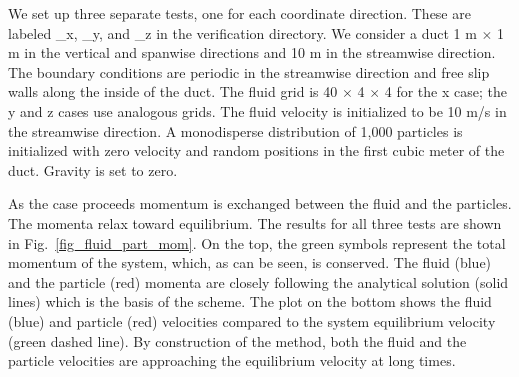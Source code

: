 \documentclass[11pt]{book}
\begin{document}
We set up three separate tests, one for each coordinate direction.  These are labeled \_x, \_y, and \_z in the verification directory.  We consider a duct 1 m $\times$ 1 m in the vertical and spanwise directions and 10 m in the streamwise direction.  The boundary conditions are periodic in the streamwise direction and free slip walls along the inside of the duct. The fluid grid is 40 $\times$ 4 $\times$ 4 for the x case; the y and z cases use analogous grids.  The fluid velocity is initialized to be 10 m/s in the streamwise direction.  A monodisperse distribution of 1,000 particles is initialized with zero velocity and random positions in the first cubic meter of the duct.  Gravity is set to zero.

As the case proceeds momentum is exchanged between the fluid and the particles.  The momenta relax toward equilibrium.  The results for all three tests are shown in Fig.~\ref{fig_fluid_part_mom}.  On the top, the green symbols represent the total momentum of the system, which, as can be seen, is conserved.  The fluid (blue) and the particle (red) momenta are closely following the analytical solution (solid lines) which is the basis of the scheme.  The plot on the bottom shows the fluid (blue) and particle (red) velocities compared to the system equilibrium velocity (green dashed line).  By construction of the method, both the fluid and the particle velocities are approaching the equilibrium velocity at long times.
\end{document}
